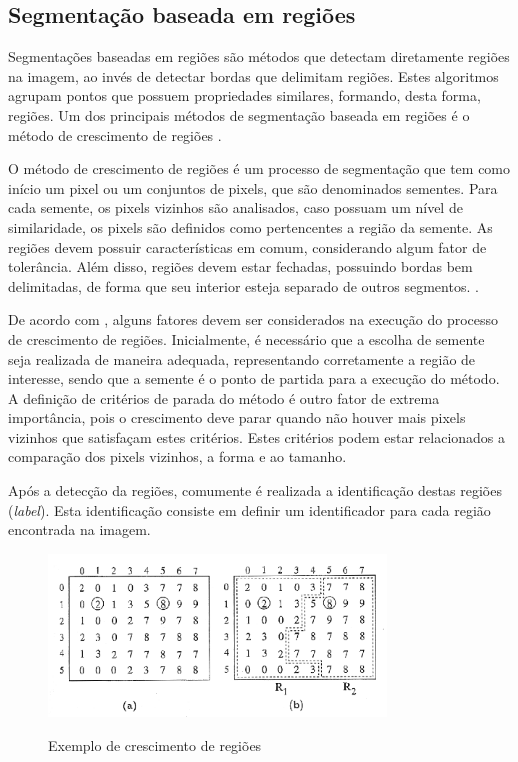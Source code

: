 \documentclass[
	12pt,				%
	oneside,			%
	a4paper,			%
	english,			%
	french,				%
	spanish,			%
	brazil,				%
	]{abntex2}
\begin{document}
\subsection{Segmentação baseada em regiões}     

Segmentações baseadas em regiões são métodos que detectam diretamente regiões na imagem, ao invés de detectar bordas que delimitam regiões. Estes algoritmos agrupam pontos que possuem propriedades similares, formando, desta forma, regiões. Um dos principais métodos de segmentação baseada em regiões é o método de crescimento de regiões \cite{pedriniSchwartz:2008}.

O método de crescimento de regiões é um processo de segmentação que tem como início um pixel ou um conjuntos de pixels, que são denominados sementes. Para cada semente, os pixels vizinhos são analisados, caso possuam um nível de similaridade, os pixels são definidos como pertencentes a região da semente. As regiões devem possuir características em comum, considerando algum fator de tolerância. Além disso, regiões devem estar fechadas, possuindo bordas bem delimitadas, de forma que seu interior esteja separado de outros segmentos. \cite{conciAzevedoLeta:2008}.

De acordo com \citet{conciAzevedoLeta:2008}, alguns fatores devem ser considerados na execução do processo de crescimento de regiões. Inicialmente, é necessário que a escolha de semente seja realizada de maneira adequada, representando corretamente a região de interesse, sendo que a semente é o ponto de partida para a execução do método. A definição de critérios de parada do método é outro fator de extrema importância, pois o crescimento deve parar quando não houver mais pixels vizinhos que satisfaçam estes critérios. Estes critérios podem estar relacionados a comparação dos pixels vizinhos, a forma e ao tamanho.

Após a detecção da regiões, comumente é realizada a identificação destas regiões (\textit{label}). Esta identificação consiste em definir um identificador para cada região encontrada na imagem. 

\begin{figure}[ht]
\centering
\caption{Exemplo de crescimento de regiões}
\includegraphics[width=0.8\textwidth]{imagens/crescimento_regiao.png}
\label{fig:crescimento_regiao}
\end{figure}
\end{document}
